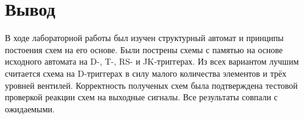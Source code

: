 \documentclass[a4paper,10pt]{article}
\begin{document}
\section*{Вывод}
В ходе лабораторной работы был изучен структурный автомат и принципы постоения схем на его основе.
Были пострены схемы с памятью на основе исходного автомата на D-, T-, RS- и JK-триггерах. Из всех
вариантом лучшим считается схема на D-триггерах в силу малого количества элементов и трёх уровней
вентилей. Корректность полученых схем была подтверждена тестовой проверкой реакции
схем на выходные сигналы. Все результаты совпали с ожидаемыми.
\end{document}
